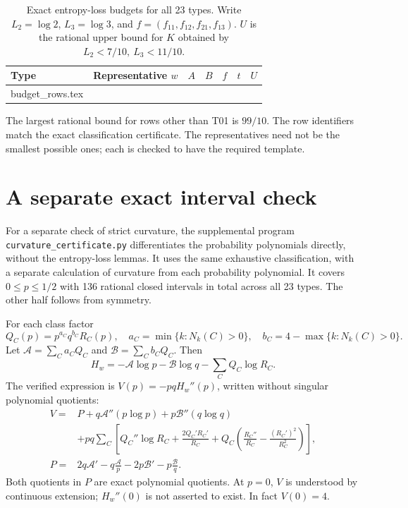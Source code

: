 \documentclass[11pt,a4paper]{article}
\makeatletter
\let\inputtable\@@input
\makeatother
\begin{document}
\clearpage
\begin{table}[ht]
\centering
\caption{Exact entropy-loss budgets for all 23 types.
Write \(L_2=\log2\), \(L_3=\log3\), and
\(f=(f_{11},f_{12},f_{21},f_{13})\).
\(U\) is the rational upper bound for \(K\) obtained by
\(L_2<7/10,\ L_3<11/10\).}\label{tab:budgets}
\small
\setlength{\tabcolsep}{5pt}
\renewcommand{\arraystretch}{1.28}
\begin{tabular}{l c c c c c c}
\toprule
Type & Representative \(w\) & \(A\) & \(B\) & \(f\) & \(t\)& \(U\)\\
\midrule
\inputtable budget_rows.tex
\bottomrule
\end{tabular}
\end{table}

The largest rational bound for rows other than T01 is \(99/10\).
The row identifiers match the exact classification certificate.
The representatives need not be the smallest possible ones; each
is checked to have the required template.

\section{A separate exact interval check}
For a separate check of strict curvature, the supplemental program
\texttt{curvature\_certificate.py} differentiates the probability
polynomials directly, without the entropy-loss lemmas.
It uses the same exhaustive classification, with a separate calculation
of curvature from each probability polynomial.
It covers \(0\le p\le1/2\) with 136 rational closed intervals in total
across all 23 types. The other half follows from symmetry.

For each class factor
\[
 Q_C(p)=p^{a_C}q^{b_C}R_C(p),\quad
 a_C=\min\{k:N_k(C)>0\},\quad
 b_C=4-\max\{k:N_k(C)>0\}.
\]
Let \(\mathcal A=\sum_Ca_CQ_C\) and
\(\mathcal B=\sum_Cb_CQ_C\). Then
\[
 H_w=-\mathcal A\log p-\mathcal B\log q
          -\sum_C Q_C\log R_C.
\]
The verified expression is \(V(p)=-pqH_w''(p)\), written without
singular polynomial quotients:
\begin{align*}
 V={}&P+q\mathcal A''(p\log p)+p\mathcal B''(q\log q)\\
 &+pq\sum_C\left[
 Q_C''\log R_C+\frac{2Q_C'R_C'}{R_C}
 +Q_C\left(\frac{R_C''}{R_C}-\frac{(R_C')^2}{R_C^2}\right)\right],\\
 P={}&2q\mathcal A'-q\frac{\mathcal A}{p}
       -2p\mathcal B'-p\frac{\mathcal B}{q}.
\end{align*}
Both quotients in \(P\) are exact polynomial quotients.
At \(p=0\), \(V\) is understood by continuous extension; \(H_w''(0)\)
is not asserted to exist. In fact \(V(0)=4\).
\end{document}

